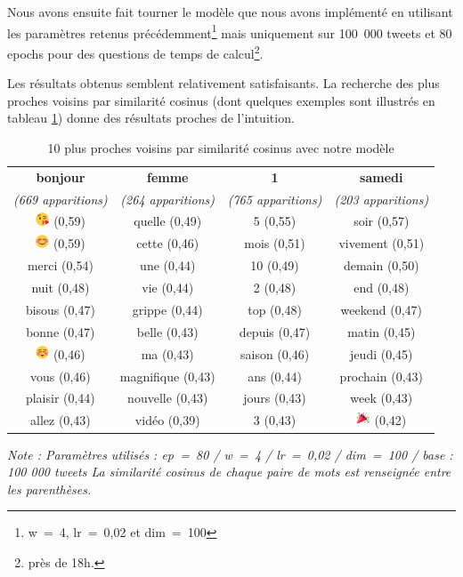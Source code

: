 \documentclass[11pt,french,french]{article}
\let\rmarkdownfootnote\footnote%
\def\footnote{\protect\rmarkdownfootnote}
\begin{document}
Nous avons ensuite fait tourner le modèle que nous avons implémenté en
utilisant les paramètres retenus précédemment\footnote{w~=~4, lr~=~0,02
  et dim~=~100} mais uniquement sur 100~000 tweets et 80 epochs pour des
questions de temps de calcul\footnote{près de 18h.}.

Les résultats obtenus semblent relativement satisfaisants. La recherche
des plus proches voisins par similarité cosinus (dont quelques exemples
sont illustrés en tableau \ref{table:knn_ark}) donne des résultats
proches de l'intuition.

\begin{table}
\begin{center}
\begin{tabular}{|c|c|c|c|}
    \hline
\textbf{bonjour} & \textbf{femme} & \textbf{1} & \textbf{samedi} \tabularnewline
\emph{(669 apparitions)} & \emph{(264 apparitions)} & \emph{(765 apparitions)} & \emph{(203 apparitions)} \tabularnewline
       \hline
\includegraphics[height=4mm]{img/emojis/1.png} (0,59) & quelle (0,49) & 5 (0,55) & soir (0,57) \tabularnewline
\includegraphics[height=4mm]{img/emojis/2.png} (0,59) & cette (0,46) & mois (0,51) & vivement (0,51) \tabularnewline
merci (0,54) & une (0,44) & 10 (0,49) & demain (0,50) \tabularnewline
nuit (0,48) & vie (0,44) & 2 (0,48) & end (0,48) \tabularnewline
bisous (0,47) & grippe (0,44) & top (0,48) & weekend (0,47) \tabularnewline
bonne (0,47) & belle (0,43) & depuis (0,47) & matin (0,45) \tabularnewline
\includegraphics[height=4mm]{img/emojis/3.png} (0,46) & ma (0,43) & saison (0,46) & jeudi (0,45) \tabularnewline
vous (0,46) & magnifique (0,43) & ans (0,44) & prochain (0,43) \tabularnewline
plaisir (0,44) & nouvelle (0,43) & jours (0,43) & week (0,43) \tabularnewline
allez (0,43) & vidéo (0,39) & 3 (0,43) & \includegraphics[height=4mm]{img/emojis/4.png} (0,42) \tabularnewline
    \hline
 \end{tabular}
\captionsetup{margin=0cm,format=hang,justification=justified}
\caption{10 plus proches voisins par similarité cosinus avec \og notre \fg{} modèle}\label{table:knn_ark}
\end{center}
\vspace{-0.3cm}
\footnotesize
\emph{Note : Paramètres utilisés : ep = 80 / w = 4 / lr = 0,02 / dim = 100 / base : 100 000 tweets\newline
La similarité cosinus de chaque paire de mots est renseignée entre les parenthèses.}

\end{table}
\end{document}
